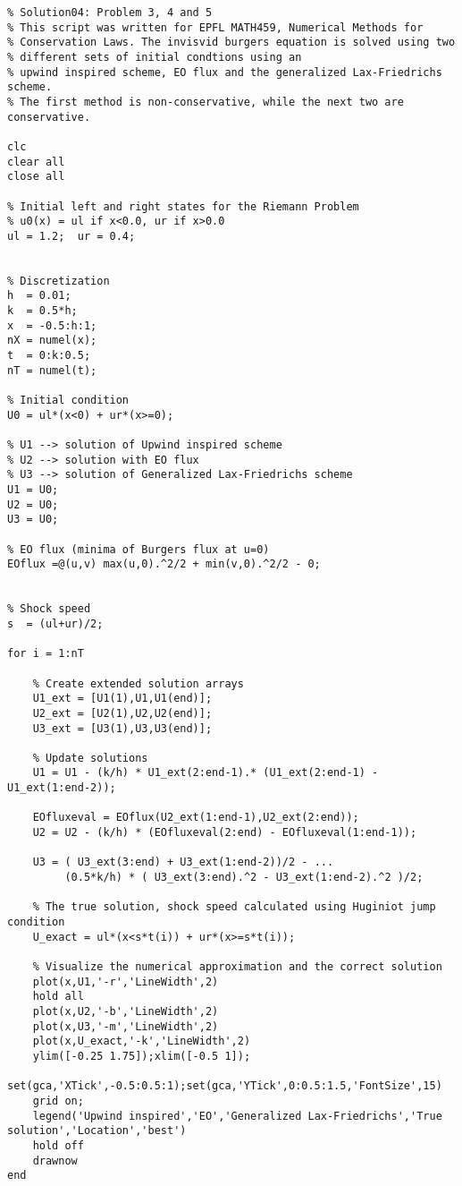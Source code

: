 \documentclass[10pt,letterpaper]{article}
\theoremstyle{break}
\begin{document}
\newpage
\begin{lstlisting}
% Solution04: Problem 3, 4 and 5
% This script was written for EPFL MATH459, Numerical Methods for
% Conservation Laws. The invisvid burgers equation is solved using two 
% different sets of initial condtions using an
% upwind inspired scheme, EO flux and the generalized Lax-Friedrichs scheme. 
% The first method is non-conservative, while the next two are conservative. 

clc
clear all
close all

% Initial left and right states for the Riemann Problem
% u0(x) = ul if x<0.0, ur if x>0.0
ul = 1.2;  ur = 0.4; 


% Discretization	
h  = 0.01;
k  = 0.5*h;
x  = -0.5:h:1;
nX = numel(x);
t  = 0:k:0.5;
nT = numel(t);

% Initial condition
U0 = ul*(x<0) + ur*(x>=0);

% U1 --> solution of Upwind inspired scheme
% U2 --> solution with EO flux
% U3 --> solution of Generalized Lax-Friedrichs scheme
U1 = U0; 
U2 = U0;
U3 = U0;

% EO flux (minima of Burgers flux at u=0)
EOflux =@(u,v) max(u,0).^2/2 + min(v,0).^2/2 - 0; 


% Shock speed
s  = (ul+ur)/2; 

for i = 1:nT
    
    % Create extended solution arrays
    U1_ext = [U1(1),U1,U1(end)];
    U2_ext = [U2(1),U2,U2(end)];
    U3_ext = [U3(1),U3,U3(end)];
    
	% Update solutions
	U1 = U1 - (k/h) * U1_ext(2:end-1).* (U1_ext(2:end-1) - U1_ext(1:end-2));
    
    EOfluxeval = EOflux(U2_ext(1:end-1),U2_ext(2:end));
    U2 = U2 - (k/h) * (EOfluxeval(2:end) - EOfluxeval(1:end-1)); 
    
	U3 = ( U3_ext(3:end) + U3_ext(1:end-2))/2 - ...
         (0.5*k/h) * ( U3_ext(3:end).^2 - U3_ext(1:end-2).^2 )/2;
	
    % The true solution, shock speed calculated using Huginiot jump condition
	U_exact = ul*(x<s*t(i)) + ur*(x>=s*t(i));
    
	% Visualize the numerical approximation and the correct solution
	plot(x,U1,'-r','LineWidth',2)
    hold all
    plot(x,U2,'-b','LineWidth',2)
    plot(x,U3,'-m','LineWidth',2)
    plot(x,U_exact,'-k','LineWidth',2)
	ylim([-0.25 1.75]);xlim([-0.5 1]);
	set(gca,'XTick',-0.5:0.5:1);set(gca,'YTick',0:0.5:1.5,'FontSize',15)
	grid on;
	legend('Upwind inspired','EO','Generalized Lax-Friedrichs','True solution','Location','best')
    hold off
	drawnow	
end



\end{lstlisting}
\end{document}
